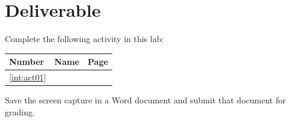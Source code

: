 \section{Deliverable}

Complete the following activity in this lab:

\begin{center}
  \begin{tabular}{lll}
    \hline 
    \textbf{Number} & \textbf{Name} & \textbf{Page} \\ 
    \hline 
    \ref{int:act01} & \nameref{int:act01} & \pageref{int:act01} \\ 
    \hline 
  \end{tabular} 
\end{center}

Save the screen capture in a Word document and submit that document for grading.



